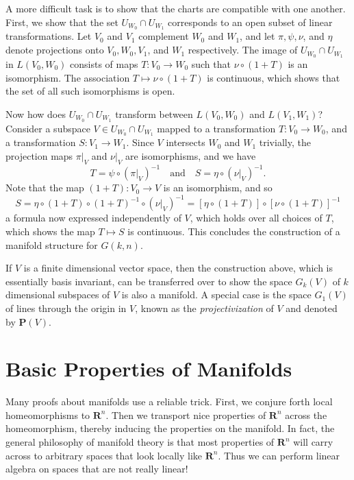 \begin{example}[Grassmannian]
    A more difficult task is to show that the charts are compatible with one another. First, we show that the set $U_{W_0} \cap U_{W_1}$ corresponds to an open subset of linear transformations. Let $V_0$ and $V_1$ complement $W_0$ and $W_1$, and let $\pi, \psi, \nu$, and $\eta$ denote projections onto $V_0, W_0, V_1$, and $W_1$ respectively. The image of $U_{W_0} \cap U_{W_1}$ in $L(V_0,W_0)$ consists of maps $T: V_0 \to W_0$ such that $\nu \circ (1 + T)$ is an isomorphism. The association $T \mapsto \nu \circ (1 + T)$ is continuous, which shows that the set of all such isomorphisms is open.

    Now how does $U_{W_0} \cap U_{W_1}$ transform between $L(V_0,W_0)$ and $L(V_1,W_1)$? Consider a subspace $V \in U_{W_0} \cap U_{W_1}$ mapped to a transformation $T: V_0 \to W_0$, and a transformation $S: V_1 \to W_1$. Since $V$ intersects $W_0$ and $W_1$ trivially, the projection maps $\pi|_V$ and $\nu|_V$ are isomorphisms, and we have
    \[ T = \psi \circ (\pi|_V)^{-1} \quad\text{and}\quad S = \eta \circ (\nu|_V)^{-1}. \]
    Note that the map $(1 + T): V_0 \to V$ is an isomorphism, and so
    \[ S = \eta \circ (1 + T) \circ (1 + T)^{-1} \circ (\nu|_V)^{-1} = [\eta \circ (1 + T)] \circ [\nu \circ (1 + T)]^{-1} \]
    a formula now expressed independently of $V$, which holds over all choices of $T$, which shows the map $T \mapsto S$ is continuous. This concludes the construction of a manifold structure for $G(k,n)$.
\end{example}

\begin{remark}
    If $V$ is a finite dimensional vector space, then the construction above, which is essentially basis invariant, can be transferred over to show the space $G_k(V)$ of $k$ dimensional subspaces of $V$ is also a manifold. A special case is the space $G_1(V)$ of lines through the origin in $V$, known as the \emph{projectivization} of $V$ and denoted by $\mathbf{P}(V)$.
\end{remark}

\section{Basic Properties of Manifolds}

Many proofs about manifolds use a reliable trick. First, we conjure forth local homeomorphisms to $\mathbf{R}^n$. Then we transport nice properties of $\mathbf{R}^n$ across the homeomorphism, thereby inducing the properties on the manifold. In fact, the general philosophy of manifold theory is that most properties of $\mathbf{R}^n$ will carry across to arbitrary spaces that look locally like $\mathbf{R}^n$. Thus we can perform linear algebra on spaces that are not really linear!

